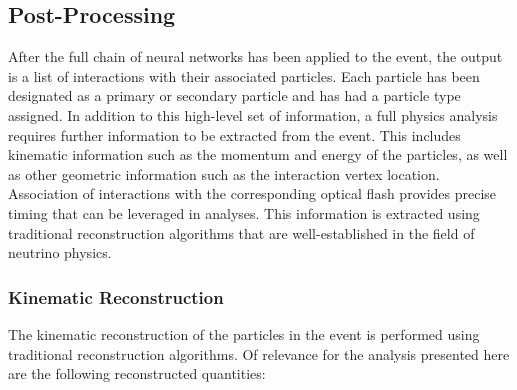 \subsection{Post-Processing}
\label{sec:post_processing}

After the full chain of neural networks has been applied to the event, the output is a list of interactions with their associated particles. Each particle has been designated as a primary or secondary particle and has had a particle type assigned. In addition to this high-level set of information, a full physics analysis requires further information to be extracted from the event. This includes kinematic information such as the momentum and energy of the particles, as well as other geometric information such as the interaction vertex location. Association of interactions with the corresponding optical flash provides precise timing that can be leveraged in analyses. This information is extracted using traditional reconstruction algorithms that are well-established in the field of neutrino physics. 

\subsubsection{Kinematic Reconstruction}
\label{sec:kinematic_reconstruction}

The kinematic reconstruction of the particles in the event is performed using traditional reconstruction algorithms. Of relevance for the analysis presented here are the following reconstructed quantities:

